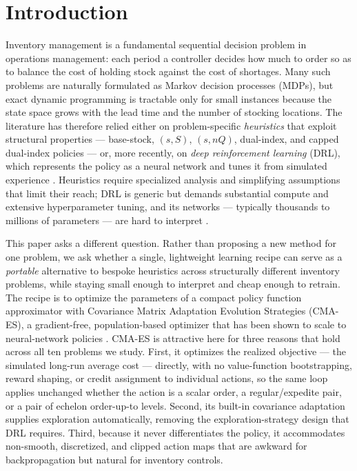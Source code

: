 \documentclass[11pt]{article}
\begin{document}
\section{Introduction}
\label{sec:introduction}

Inventory management is a fundamental sequential decision problem in operations management: each
period a controller decides how much to order so as to balance the cost of holding stock against the
cost of shortages. Many such problems are naturally formulated as Markov decision processes (MDPs),
but exact dynamic programming is tractable only for small instances because the state space grows
with the lead time and the number of stocking locations. The literature has therefore relied either
on problem-specific \emph{heuristics} that exploit structural properties --- base-stock, $(s,S)$,
$(s,nQ)$, dual-index, and capped dual-index policies \citep{arrow1951optimal,scarf1960ss} --- or, more recently, on \emph{deep
reinforcement learning} (DRL), which represents the policy as a neural network and tunes it from
simulated experience \citep{gijsbrechts2022drl,boute2022deep}. Heuristics require specialized
analysis and simplifying assumptions that limit their reach; DRL is generic but demands substantial
compute and extensive hyperparameter tuning, and its networks --- typically thousands to millions of
parameters --- are hard to interpret \citep{gijsbrechts2022drl,kaynov2024owmr}.

This paper asks a different question. Rather than proposing a new method for one problem, we ask
whether a single, lightweight learning recipe can serve as a \emph{portable} alternative to bespoke
heuristics across structurally different inventory problems, while staying small enough to interpret
and cheap enough to retrain. The recipe is to optimize the parameters of a compact policy function
approximator with Covariance Matrix Adaptation Evolution Strategies (CMA-ES), a gradient-free,
population-based optimizer that has been shown to scale to neural-network policies
\citep{Hansen2001CompletelyStrategies,Salimans2017EvolutionLearning}. CMA-ES is attractive here for
three reasons that hold across all ten problems we study. First, it optimizes the
realized objective --- the simulated long-run average cost --- directly, with no value-function
bootstrapping, reward shaping, or credit assignment to individual actions, so the same loop applies
unchanged whether the action is a scalar order, a regular/expedite pair, or a pair of echelon
order-up-to levels. Second, its built-in covariance adaptation supplies exploration automatically,
removing the exploration-strategy design that DRL requires. Third, because it never differentiates
the policy, it accommodates non-smooth, discretized, and clipped action maps that are awkward for
backpropagation but natural for inventory controls.
\end{document}
